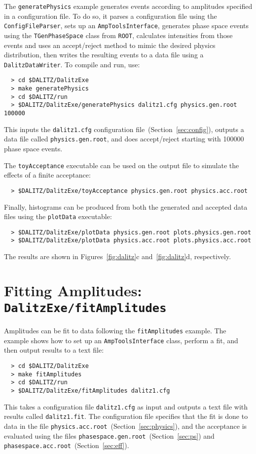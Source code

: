 \documentclass[11pt]{article}
\begin{document}
The {\tt generatePhysics} example generates events according to amplitudes specified in a configuration file.  To do so, it parses a configuration file using the {\tt ConfigFileParser}, sets up an {\tt AmpToolsInterface}, generates phase space events using the {\tt TGenPhaseSpace} class from {\tt ROOT}, calculates intensities from those events and uses an accept/reject method to mimic the desired physics distribution, then writes the resulting events to a data file using a {\tt DalitzDataWriter}.  To compile and run, use:
\begin{verbatim}
  > cd $DALITZ/DalitzExe
  > make generatePhysics
  > cd $DALITZ/run
  > $DALITZ/DalitzExe/generatePhysics dalitz1.cfg physics.gen.root 100000
\end{verbatim}
This inputs the {\tt dalitz1.cfg} configuration file~(Section~\ref{sec:config}), outputs a data file called {\tt physics.gen.root}, and does accept/reject starting with 100000 phase space events.

The {\tt toyAcceptance} executable can be used on the output file to simulate the effects of a finite acceptance:
\begin{verbatim}
  > $DALITZ/DalitzExe/toyAcceptance physics.gen.root physics.acc.root
\end{verbatim}
Finally, histograms can be produced from both the generated and accepted data files using the {\tt plotData} executable:
\begin{verbatim}
  > $DALITZ/DalitzExe/plotData physics.gen.root plots.physics.gen.root
  > $DALITZ/DalitzExe/plotData physics.acc.root plots.physics.acc.root
\end{verbatim}
The results are shown in Figures~\ref{fig:dalitz}c and~\ref{fig:dalitz}d, respectively.

\section{Fitting Amplitudes: \\
{\tt DalitzExe/fitAmplitudes}}
\label{sec:fit}

Amplitudes can be fit to data following the {\tt fitAmplitudes} example.  The example shows how to set up an {\tt AmpToolsInterface} class, perform a fit, and then output results to a text file:
\begin{verbatim}
  > cd $DALITZ/DalitzExe
  > make fitAmplitudes
  > cd $DALITZ/run
  > $DALITZ/DalitzExe/fitAmplitudes dalitz1.cfg
\end{verbatim}
This takes a configuration file {\tt dalitz1.cfg} as input and outputs a text file with results called {\tt dalitz1.fit}.  The configuration file specifies that the fit is done to data in the file {\tt physics.acc.root}~(Section~\ref{sec:physics}), and the acceptance is evaluated using the files {\tt phasespace.gen.root}~(Section~\ref{sec:ps}) and {\tt phasespace.acc.root}~(Section~\ref{sec:eff}).
\end{document}
